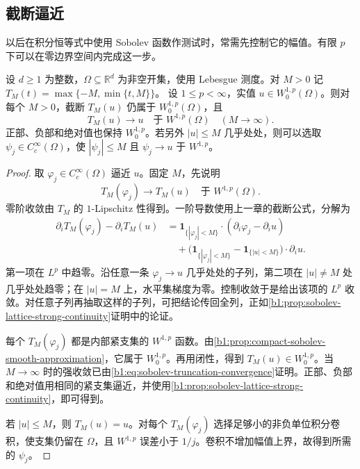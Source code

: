 \subsection{截断逼近}
\label{b1:subsec:220203}

以后在积分恒等式中使用 Sobolev 函数作测试时，常需先控制它的幅值。有限 \(p\) 下可以在零边界空间内完成这一步。

\begin{proposition}\label{b1:prop:w0-truncation}
设 \(d\geq1\) 为整数，\(\Omega\subseteq\mathbb R^d\) 为非空开集，使用 Lebesgue 测度。对 \(M>0\) 记 \(T_M(t)=\max\{-M,\min\{t,M\}\}\)。
设 \(1\le p<\infty\)，实值 \(u\in W_0^{1,p}(\Omega)\)。则对每个 \(M>0\)，截断 \(T_M(u)\) 仍属于 \(W_0^{1,p}(\Omega)\)，且
\[
 T_M(u)\longrightarrow u\quad\text{于 }W^{1,p}(\Omega)
 \quad(M\to\infty).
\]
正部、负部和绝对值也保持 \(W_0^{1,p}\)。若另外 \(|u|\le M\) 几乎处处，则可以选取 \(\psi_j\in C_c^\infty(\Omega)\)，使 \(|\psi_j|\le M\) 且 \(\psi_j\to u\) 于 \(W^{1,p}\)。
\end{proposition}
\begin{proof}
取 \(\varphi_j\in C_c^\infty(\Omega)\) 逼近 \(u\)。固定 \(M\)，先说明
\[
 T_M(\varphi_j)\longrightarrow T_M(u)\quad\text{于 }W^{1,p}(\Omega).
\]
零阶收敛由 \(T_M\) 的 \(1\)-Lipschitz 性得到。一阶导数使用上一章的截断公式，分解为
\[
 \begin{aligned}
 \partial_iT_M(\varphi_j)-\partial_iT_M(u)
 &=\mathbf1_{\{|\varphi_j|<M\}}\cdot(\partial_i\varphi_j-\partial_i u)\\
 &\quad+
  \bigl(\mathbf1_{\{|\varphi_j|<M\}}-\mathbf1_{\{|u|<M\}}\bigr)\cdot\partial_i u.
 \end{aligned}
\]
第一项在 \(L^p\) 中趋零。沿任意一条 \(\varphi_j\to u\) 几乎处处的子列，第二项在 \(|u|\ne M\) 处几乎处处趋零；在 \(|u|=M\) 上，水平集梯度为零。控制收敛于是给出该项的 \(L^p\) 收敛。对任意子列再抽取这样的子列，可把结论传回全列，正如\cref{b1:prop:sobolev-lattice-strong-continuity}证明中的论证。

每个 \(T_M(\varphi_j)\) 都是内部紧支集的 \(W^{1,p}\) 函数。由\cref{b1:prop:compact-sobolev-smooth-approximation}，它属于 \(W_0^{1,p}\)。再用闭性，得到 \(T_M(u)\in W_0^{1,p}\)。当 \(M\to\infty\) 时的强收敛已由\eqref{b1:eq:sobolev-truncation-convergence}证明。正部、负部和绝对值用相同的紧支集逼近，并使用\cref{b1:prop:sobolev-lattice-strong-continuity}，即可得到。

若 \(|u|\le M\)，则 \(T_M(u)=u\)。对每个 \(T_M(\varphi_j)\) 选择足够小的非负单位积分卷积，使支集仍留在 \(\Omega\)，且 \(W^{1,p}\) 误差小于 \(1/j\)。卷积不增加幅值上界，故得到所需的 \(\psi_j\)。
\end{proof}

